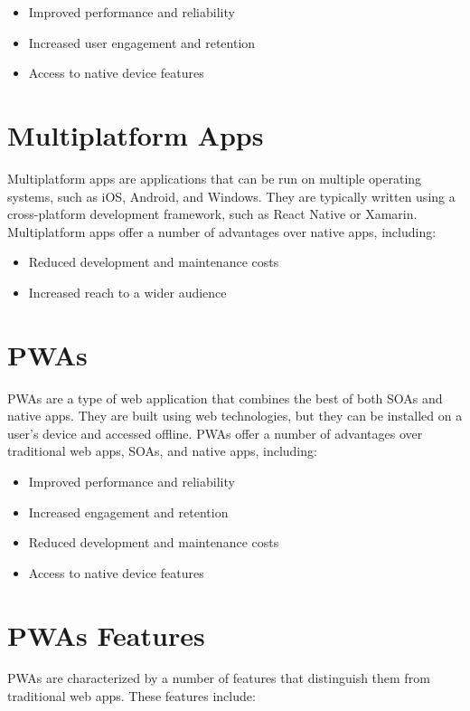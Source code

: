 \documentclass{report}
\begin{document}
\begin{itemize}
    \item Improved performance and reliability
    \item Increased user engagement and retention
    \item Access to native device features
\end{itemize}

\section{Multiplatform Apps}\label{App Multiplatform}

Multiplatform apps are applications that can be run on multiple operating systems, such as iOS, Android, and Windows. They are typically written using a cross-platform development framework, such as React Native or Xamarin. Multiplatform apps offer a number of advantages over native apps, including: \cite{mozilla23}

\begin{itemize}
    \item Reduced development and maintenance costs
    \item Increased reach to a wider audience
\end{itemize}

\section{PWAs}\label{PWAs}
PWAs are a type of web application that combines the best of both SOAs and native apps. They are built using web technologies, but they can be installed on a user's device and accessed offline. PWAs offer a number of advantages over traditional web apps, SOAs, and native apps, including: 

\begin{itemize}
    \item Improved performance and reliability
    \item Increased engagement and retention
    \item Reduced development and maintenance costs
    \item Access to native device features
\end{itemize}

\section{PWAs Features}\label{PWAsFeatures}
PWAs are characterized by a number of features that distinguish them from traditional web apps. These features include:
\end{document}
